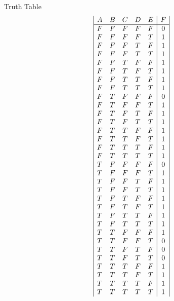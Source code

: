 \begin{center}
    Truth Table
    \begin{displaymath}
    \begin{array}{| c  c  c  c  c | c |}
    A & B & C & D & E & F\\
    \hline
    F & F & F & F & F & 0 \\
    F & F & F & F & T & 1 \\
    F & F & F & T & F & 1 \\
    F & F & F & T & T & 1 \\
    F & F & T & F & F & 1 \\
    F & F & T & F & T & 1 \\
    F & F & T & T & F & 1 \\
    F & F & T & T & T & 1 \\
    F & T & F & F & F & 0 \\
    F & T & F & F & T & 1 \\
    F & T & F & T & F & 1 \\
    F & T & F & T & T & 1 \\
    F & T & T & F & F & 1 \\
    F & T & T & F & T & 1 \\
    F & T & T & T & F & 1 \\
    F & T & T & T & T & 1 \\
    T & F & F & F & F & 0 \\
    T & F & F & F & T & 1 \\
    T & F & F & T & F & 1 \\
    T & F & F & T & T & 1 \\
    T & F & T & F & F & 1 \\
    T & F & T & F & T & 1 \\
    T & F & T & T & F & 1 \\
    T & F & T & T & T & 1 \\
    T & T & F & F & F & 1 \\
    T & T & F & F & T & 0 \\
    T & T & F & T & F & 0 \\
    T & T & F & T & T & 0 \\
    T & T & T & F & F & 1 \\
    T & T & T & F & T & 1 \\
    T & T & T & T & F & 1 \\
    T & T & T & T & T & 1 \\
    \end{array}
    \end{displaymath}
\end{center}
